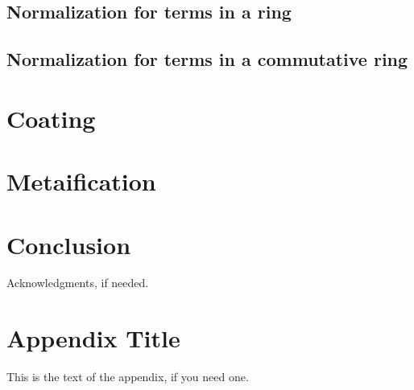 \documentclass{sigplanconf}
\begin{document}
\subsection{Normalization for terms in a ring}

\subsection{Normalization for terms in a commutative ring}

\section{Coating}

\section{Metaification}

\section{Conclusion}



\acks

Acknowledgments, if needed.





\appendix
\section{Appendix Title}

This is the text of the appendix, if you need one.
\end{document}
